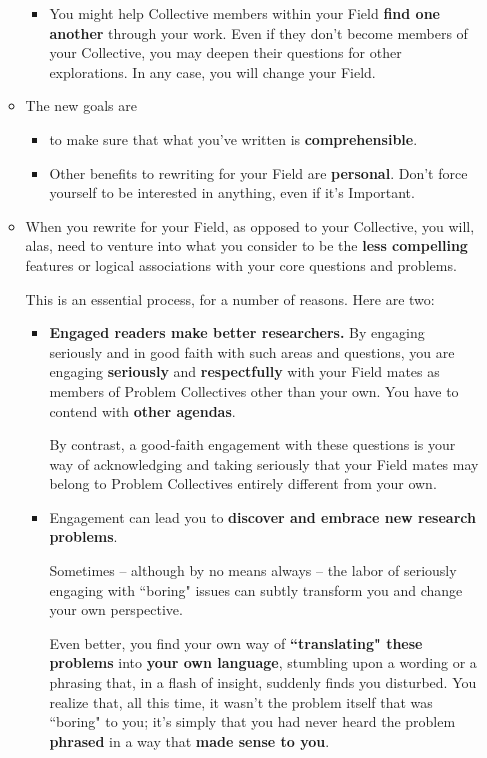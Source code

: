\documentclass[11pt]{article}
\begin{document}
\begin{itemize}
\begin{exercise}
\begin{itemize}
\begin{itemize}
\item You might help Collective members within your Field \textbf{find one another} through your work. Even if they don’t become members of your Collective, you may deepen their questions for other explorations. In any case, you will change your Field.
\end{itemize}

\item The new goals are
\begin{itemize}
\item to make sure that what you’ve written is \textbf{comprehensible}. 

\item Other benefits to rewriting for your Field are \textbf{personal}. Don’t force yourself to be interested in anything, even if it’s Important.
\end{itemize}

\item When you rewrite for your Field, as opposed to your Collective, you will, alas, need to venture into what you consider to be the \textbf{less compelling} features or logical associations with your core questions and problems. 

This is an essential process, for a number of reasons. Here are two:
\begin{itemize}
\item \textbf{Engaged readers make better researchers.} By engaging seriously and in good faith with such areas and questions, you are engaging \textbf{seriously} and \textbf{respectfully} with your Field mates as members of Problem Collectives other than your own. You have to contend with \textbf{other agendas}. 

By contrast, a good-faith engagement with these questions is your way of acknowledging and taking seriously that your Field mates may belong to Problem Collectives entirely different from your own.

\item Engagement can lead you to \textbf{discover and embrace new research problems}. 

Sometimes -- although by no means always -- the labor of seriously engaging with ``boring" issues can subtly transform you and change your own perspective.

Even better, you find your own way of \textbf{``translating" these problems} into \textbf{your own language}, stumbling upon a wording or a phrasing that, in a flash of insight, suddenly finds you disturbed. You realize that, all this time, it wasn’t the problem itself that was ``boring" to you; it’s simply that you had never heard the problem \textbf{phrased} in a way that \textbf{made sense to you}.
\end{itemize}


\end{itemize}
\end{exercise}
\end{itemize}
\end{document}
